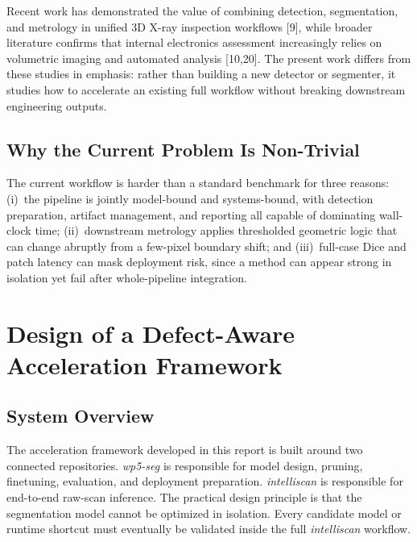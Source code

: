 Recent work has demonstrated the value of combining detection, segmentation, and metrology in unified 3D X-ray inspection workflows {[}9{]}, while broader literature confirms that internal electronics assessment increasingly relies on volumetric imaging and automated analysis {[}10,20{]}. The present work differs from these studies in emphasis: rather than building a new detector or segmenter, it studies how to accelerate an existing full workflow without breaking downstream engineering outputs.

\hypertarget{why-the-current-problem-is-non-trivial}{%
\section{Why the Current Problem Is Non-Trivial}\label{why-the-current-problem-is-non-trivial}}

The current workflow is harder than a standard benchmark for three reasons: (i)~the pipeline is jointly model-bound and systems-bound, with detection preparation, artifact management, and reporting all capable of dominating wall-clock time; (ii)~downstream metrology applies thresholded geometric logic that can change abruptly from a few-pixel boundary shift; and (iii)~full-case Dice and patch latency can mask deployment risk, since a method can appear strong in isolation yet fail after whole-pipeline integration.

\hypertarget{design-of-a-defect-aware-acceleration-framework}{%
\chapter{Design of a Defect-Aware Acceleration
Framework}\label{design-of-a-defect-aware-acceleration-framework}}

\hypertarget{system-overview}{%
\section{System Overview}\label{system-overview}}

The acceleration framework developed in this report is built around two
connected repositories. \emph{wp5-seg} is responsible for model
design, pruning, finetuning, evaluation, and deployment preparation.
\emph{intelliscan} is responsible for end-to-end raw-scan inference.
The practical design principle is that the segmentation model cannot be
optimized in isolation. Every candidate model or runtime shortcut must
eventually be validated inside the full \emph{intelliscan} workflow.

